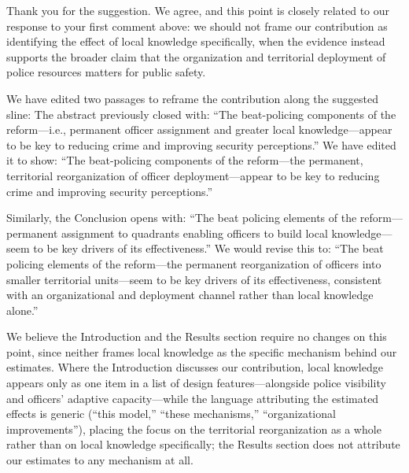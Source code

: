 


Thank you for the suggestion. We agree, and this point is closely related to our response to your first comment above: we should not frame our contribution as identifying the effect of local knowledge specifically, when the evidence instead supports the broader claim that the organization and territorial deployment of police resources matters for public safety.

We have edited two passages to reframe the contribution along the suggested sline: The abstract previously closed with: ``The beat-policing components of the reform---i.e., permanent officer assignment and greater local knowledge---appear to be key to reducing crime and improving security perceptions.'' We have edited it to show: ``The beat-policing components of the reform---the permanent, territorial reorganization of officer deployment---appear to be key to reducing crime and improving security perceptions.''

Similarly, the Conclusion opens with: ``The beat policing elements of the reform---permanent assignment to quadrants enabling officers to build local knowledge---seem to be key drivers of its effectiveness.'' We would revise this to: ``The beat policing elements of the reform---the permanent reorganization of officers into smaller territorial units---seem to be key drivers of its effectiveness, consistent with an organizational and deployment channel rather than local knowledge alone.''

We believe the Introduction and the Results section require no changes on this point, since neither frames local knowledge as the specific mechanism behind our estimates. Where the Introduction discusses our contribution, local knowledge appears only as one item in a list of design features---alongside police visibility and officers' adaptive capacity---while the language attributing the estimated effects is generic (``this model,'' ``these mechanisms,'' ``organizational improvements''), placing the focus on the territorial reorganization as a whole rather than on local knowledge specifically; the Results section does not attribute our estimates to any mechanism at all.




